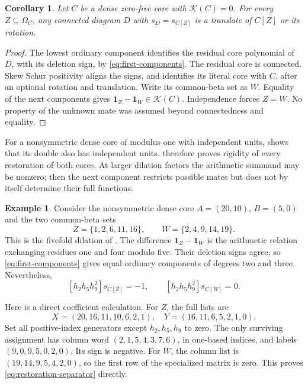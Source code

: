\documentclass[11pt,a4paper]{amsart}
\numberwithin{equation}{section}
\theoremstyle{plain}
\newtheorem{corollary}[theorem]{Corollary}
\theoremstyle{definition}
\newtheorem{example}[theorem]{Example}
\newcommand{\K}{\mathcal K}
\begin{document}
\begin{corollary}\label{cor:independent-restorations}
Let \(C\) be a dense zero-free core with \(\K(C)=0\).
For every \(Z\subseteq\Omega_C\), any connected diagram \(D\) with
\(s_D=s_{C[Z]}\) is a translate of \(C[Z]\) or its rotation.
\end{corollary}

\begin{proof}
The lowest ordinary component identifies the residual core polynomial of
\(D\), with its deletion sign, by \eqref{eq:first-components}.
The residual core is connected.  Skew Schur positivity aligns the signs, and
 identifies its literal core with \(C\),
after an optional rotation and translation.  Write its common-beta set as
\(W\).  Equality of the next components gives \(\mathbf1_Z-\mathbf1_W\in\K(C)\).
Independence forces \(Z=W\).  No property of the unknown mate was assumed
beyond connectedness and equality.
\end{proof}

For a nonsymmetric dense core of modulus one with independent units,
 shows that its double also has independent
units.   therefore proves rigidity of
every restoration of both cores.  At larger dilation factors the arithmetic
summand may be nonzero; then the next component restricts possible mates but
does not by itself determine their full functions.

\begin{example}\label{ex:unequal-restorations}
Consider the nonsymmetric dense core \(A=(20,10)\), \(B=(5,0)\) and the two
common-beta sets
\[
 Z=\{1,2,6,11,16\},\qquad
 W=\{2,4,9,14,19\}.
\]
This is the fivefold dilation of .
The difference \(\mathbf1_Z-\mathbf1_W\) is the arithmetic relation
exchanging residues one and four modulo five.  Their deletion signs agree,
so \eqref{eq:first-components} gives equal ordinary components of degrees
two and three.  Nevertheless,
\begin{equation}\label{eq:restoration-separator}
 [h_2h_5h_9^2]s_{C[Z]}=-1,\qquad
 [h_2h_5h_9^2]s_{C[W]}=0.
\end{equation}

Here is a direct coefficient calculation.  For \(Z\), the full lists are
\[
 X=(20,16,11,10,6,2,1),\quad
 Y=(16,11,6,5,2,1,0).
\]
Set all positive-index generators except \(h_2,h_5,h_9\) to zero.
The only surviving assignment has column word
\((2,1,5,4,3,7,6)\), in one-based indices, and labels
\((9,0,9,5,0,2,0)\).  Its sign is negative.
For \(W\), the column list is \((19,14,9,5,4,2,0)\), so the first row
of the specialized matrix is zero.  This proves
\eqref{eq:restoration-separator} directly.
\end{example}
\end{document}
